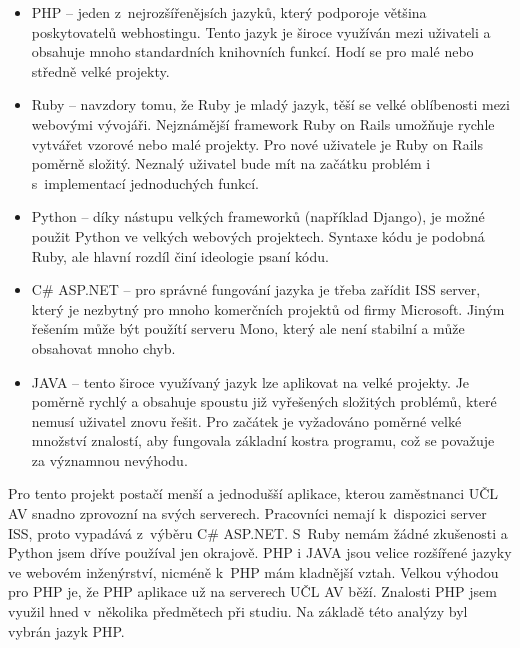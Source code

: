             \begin{itemize}
                \item PHP – jeden z~nejrozšířenějsích jazyků, který podporoje většina poskytovatelů webhostingu. Tento jazyk je široce využíván mezi uživateli a obsahuje mnoho standardních knihovních funkcí. Hodí se pro malé nebo středně velké projekty.
                
                \item Ruby – navzdory tomu, že Ruby je mladý jazyk, těší se velké oblíbenosti mezi webovými vývojáři. Nejznámější framework Ruby on Rails umožňuje rychle vytvářet vzorové nebo malé projekty. Pro nové uživatele je Ruby on Rails poměrně složitý. Neznalý uživatel bude mít na začátku problém i s~implementací jednoduchých funkcí.
                
                \item Python – díky nástupu velkých frameworků (například Django), je možné použit Python ve velkých webových projektech. Syntaxe kódu je podobná Ruby, ale hlavní rozdíl činí ideologie psaní kódu.
                
                \item C\# ASP.NET – pro správné fungování jazyka je třeba zařídit ISS server, který je nezbytný pro mnoho komerčních projektů od firmy Microsoft. Jiným řešením může být použítí serveru Mono, který ale není stabilní a může obsahovat mnoho chyb.
                
                \item JAVA – tento široce využívaný jazyk lze aplikovat na velké projekty. Je poměrně rychlý a obsahuje spoustu již vyřešených složitých problémů, které nemusí uživatel znovu řešit. Pro začátek je vyžadováno poměrné velké množství znalostí, aby fungovala základní kostra programu, což se považuje za významnou nevýhodu.
            \end{itemize}

            Pro tento projekt postačí menší a jednodušší aplikace, kterou zaměstnanci UČL AV snadno zprovozní na svých serverech. Pracovníci nemají k~dispozici server ISS, proto vypadává z~výběru C\# ASP.NET. S~Ruby nemám žádné zkušenosti a Python jsem dříve používal jen okrajově. PHP i JAVA jsou velice rozšířené jazyky ve webovém inženýrství, nicméně k~PHP mám kladnější vztah. Velkou výhodou pro PHP je, že PHP aplikace už na serverech UČL AV běží. Znalosti PHP jsem využil hned v~několika předmětech při studiu. Na základě této analýzy byl vybrán jazyk PHP.
            
